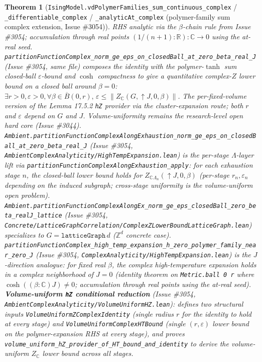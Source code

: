 \documentclass[a4paper,11pt]{article}
\newtheorem{theorem}{Theorem}
\begin{document}
\begin{theorem}[\texttt{IsingModel.vdPolymerFamilies\_sum\_continuous\_complex} /
\texttt{\_differentiable\_complex} / \texttt{\_analyticAt\_complex} (polymer-family sum
complex extension, Issue \#3054)]
RHS analytic via the \(\beta\)-chain rule from Issue \#3054; accumulation
through real points \((1/(n+1):\mathbb{R}):\mathbb{C}\to0\) using the at-real
seed.
\texttt{partitionFunctionComplex\_norm\_ge\_eps\_on\_closedBall\_at\_zero\_beta\_real\_J}
(Issue \#3054, same file) composes the identity with the polymer-\(\tanh\) sum
closed-ball \(\varepsilon\)-bound and \(\cosh\) compactness to give a
quantitative complex-\(Z\) lower bound on a closed ball around \(\beta=0\):
\(\exists r>0,\varepsilon>0,\forall\beta\in\overline{B}(0,r),\,
\varepsilon\le\|Z_{\mathbb{C}}(G,\uparrow J,0,\beta)\|\). The per-fixed-volume
version of the Lemma 17.5.2 \texttt{hZ} provider via the cluster-expansion
route; both \(r\) and \(\varepsilon\) depend on \(G\) and \(J\). Volume-uniformity
remains the research-level open hard core (Issue \#3044).
\texttt{Ambient.partitionFunctionComplexAlongExhaustion\_norm\_ge\_eps\_on\_closedBall\_at\_zero\_beta\_real\_J}
(Issue \#3054, \texttt{AmbientComplexAnalyticity/HighTempExpansion.lean}) is the
per-stage \(\Lambda\)-layer lift via \texttt{partitionFunctionComplexAlongExhaustion\_apply}:
for each exhaustion stage \(n\), the closed-ball lower bound holds for
\(Z_{\mathbb{C}}{}_{\Lambda_n}(\uparrow J, 0, \beta)\) (per-stage
\(r_n,\varepsilon_n\) depending on the induced subgraph; cross-stage uniformity
is the volume-uniform open problem).
\texttt{Ambient.partitionFunctionComplexAlongEx\_norm\_ge\_eps\_closedBall\_zero\_beta\_realJ\_lattice}
(Issue \#3054,
\texttt{Concrete/LatticeGraphCorrelation/ComplexZLowerBoundLatticeGraph.lean})
specializes to \(G=\texttt{latticeGraph}\,d\) (\(\mathbb{Z}^d\) concrete case).
\texttt{partitionFunctionComplex\_high\_temp\_expansion\_h\_zero\_polymer\_family\_near\_zero\_J}
(Issue \#3054, \texttt{ComplexAnalyticity/HighTempExpansion.lean}) is the
\(J\)-direction analogue: for fixed real \(\beta\), the complex high-temperature
expansion holds in a complex neighborhood of \(J=0\) (identity theorem on
\texttt{Metric.ball 0 r} where \(\cosh((\beta:\mathbb{C})J)\ne0\); accumulation
through real points using the at-real seed).
\textbf{Volume-uniform \texttt{hZ} conditional reduction} (Issue \#3054,
\texttt{AmbientComplexAnalyticity/VolumeUniformHZ.lean}): defines two
structural inputs
\texttt{VolumeUniformZComplexIdentity} (single radius \(r\) for the identity
to hold at every stage) and \texttt{VolumeUniformComplexHTBound} (single
\((r,\varepsilon)\) lower bound on the polymer-expansion RHS at every stage),
and proves \texttt{volume\_uniform\_hZ\_provider\_of\_HT\_bound\_and\_identity}
to derive the volume-uniform \(Z_{\mathbb{C}}\) lower bound across all stages.

\end{theorem}
\end{document}
